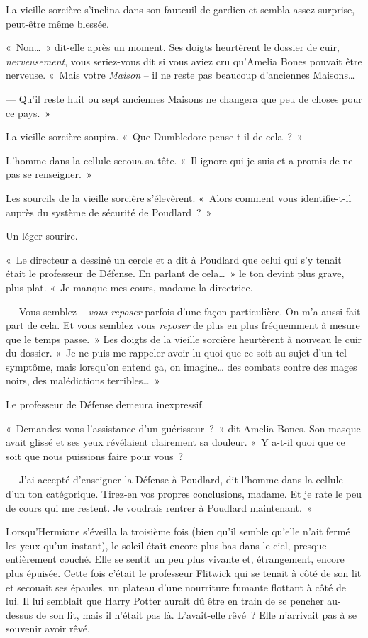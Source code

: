 La vieille sorcière s'inclina dans son fauteuil de gardien et sembla assez surprise, peut-être même blessée.

«~Non…~» dit-elle après un moment.
Ses doigts heurtèrent le dossier de cuir, \emph{nerveusement}, vous seriez-vous dit si vous aviez cru qu'Amelia Bones pouvait être nerveuse.
«~Mais votre \emph{Maison} -- il ne reste pas beaucoup d'anciennes Maisons…

--- Qu'il reste huit ou sept anciennes Maisons ne changera que peu de choses pour ce pays.~»

La vieille sorcière soupira.
«~Que Dumbledore pense-t-il de cela~?~»

L'homme dans la cellule secoua sa tête.
«~Il ignore qui je suis et a promis de ne pas se renseigner.~»

Les sourcils de la vieille sorcière s'élevèrent.
«~Alors comment vous identifie-t-il auprès du système de sécurité de Poudlard~?~»

Un léger sourire.

«~Le directeur a dessiné un cercle et a dit à Poudlard que celui qui s'y tenait était le professeur de Défense.
En parlant de cela…~»
le ton devint plus grave, plus plat.
«~Je manque mes cours, madame la directrice.

--- Vous semblez -- \emph{vous reposer} parfois d'une façon particulière.
On m'a aussi fait part de cela.
Et vous semblez vous \emph{reposer} de plus en plus fréquemment à mesure que le temps passe.~»
Les doigts de la vieille sorcière heurtèrent à nouveau le cuir du dossier.
«~Je ne puis me rappeler avoir lu quoi que ce soit au sujet d'un tel symptôme, mais lorsqu'on entend ça, on imagine… des combats contre des mages noirs, des malédictions terribles…~»

Le professeur de Défense demeura inexpressif.

«~Demandez-vous l'assistance d'un guérisseur~?~»
dit Amelia Bones.
Son masque avait glissé et ses yeux révélaient clairement sa douleur.
«~Y a-t-il quoi que ce soit que nous puissions faire pour vous~?

--- J'ai accepté d'enseigner la Défense à Poudlard, dit l'homme dans la cellule d'un ton catégorique.
Tirez-en vos propres conclusions, madame.
Et je rate le peu de cours qui me restent.
Je voudrais rentrer à Poudlard maintenant.~»

\later

Lorsqu'Hermione s'éveilla la troisième fois (bien qu'il semble qu'elle n'ait fermé les yeux qu'un instant), le soleil était encore plus bas dans le ciel, presque entièrement couché.
Elle se sentit un peu plus vivante et, étrangement, encore plus épuisée.
Cette fois c'était le professeur Flitwick qui se tenait à côté de son lit et secouait ses épaules, un plateau d'une nourriture fumante flottant à côté de lui.
Il lui semblait que Harry Potter aurait dû être en train de se pencher au-dessus de son lit, mais il n'était pas là.
L'avait-elle rêvé~?
Elle n'arrivait pas à se souvenir avoir rêvé.

